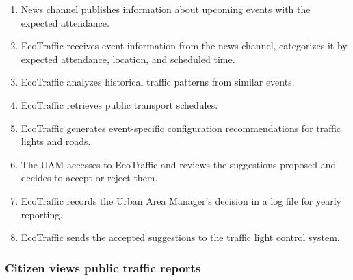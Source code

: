 \documentclass[12pt, a4paper, twoside, openright]{report}
\begin{document}
\begin{enumerate}
\item
  News channel publishes information about upcoming events with the
  expected attendance.
\item
  EcoTraffic receives event information from the news channel, categorizes it by expected attendance, location, and scheduled time.
\item
  EcoTraffic analyzes historical traffic patterns from similar events.
\item
  EcoTraffic retrieves public transport schedules.
\item
  EcoTraffic generates event-specific configuration recommendations for
  traffic lights and roads.
\item
  The UAM accesses to EcoTraffic and reviews the suggestions proposed
  and decides to accept or reject them.
\item
  EcoTraffic records the Urban Area Manager's decision in a log file for yearly reporting.
\item
  EcoTraffic sends the accepted suggestions to the traffic light control system.
\end{enumerate}

\subsubsection{Citizen views public traffic reports}\label{subsubsec:citizen-views}
\end{document}
